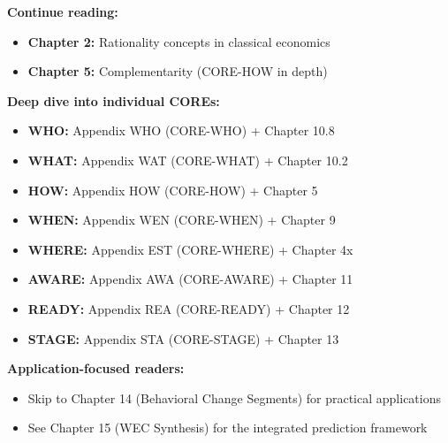 \begin{tcolorbox}[colback=green!5!white, colframe=green!75!black,
    title=\textbf{Reading Paths from Chapter 1b}]
\small

\textbf{Continue reading:}
\begin{itemize}[nosep]
    \item \textbf{Chapter 2:} Rationality concepts in classical economics
    \item \textbf{Chapter 5:} Complementarity (CORE-HOW in depth)
\end{itemize}

\medskip
\textbf{Deep dive into individual COREs:}
\begin{itemize}[nosep]
    \item \textbf{WHO:} Appendix WHO (CORE-WHO) + Chapter 10.8
    \item \textbf{WHAT:} Appendix WAT (CORE-WHAT) + Chapter 10.2
    \item \textbf{HOW:} Appendix HOW (CORE-HOW) + Chapter 5
    \item \textbf{WHEN:} Appendix WEN (CORE-WHEN) + Chapter 9
    \item \textbf{WHERE:} Appendix EST (CORE-WHERE) + Chapter 4x
    \item \textbf{AWARE:} Appendix AWA (CORE-AWARE) + Chapter 11
    \item \textbf{READY:} Appendix REA (CORE-READY) + Chapter 12
    \item \textbf{STAGE:} Appendix STA (CORE-STAGE) + Chapter 13
\end{itemize}

\medskip
\textbf{Application-focused readers:}
\begin{itemize}[nosep]
    \item Skip to Chapter 14 (Behavioral Change Segments) for practical applications
    \item See Chapter 15 (WEC Synthesis) for the integrated prediction framework
\end{itemize}
\end{tcolorbox}

